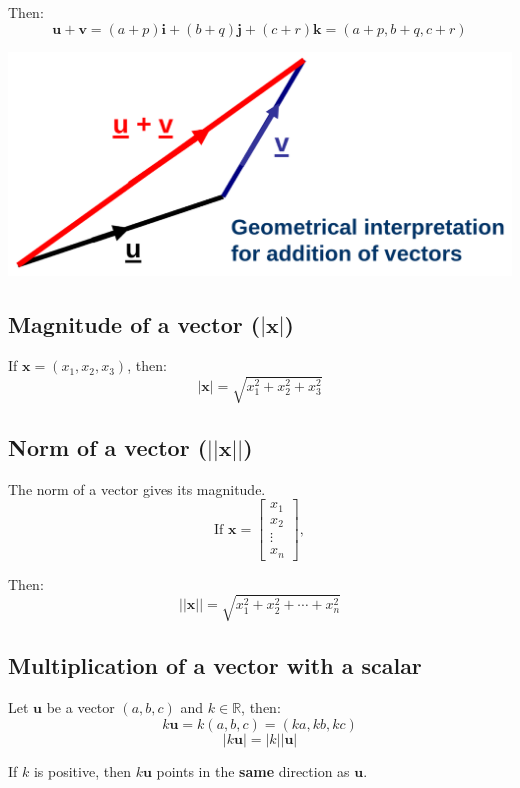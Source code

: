 \documentclass[11pt]{article}
\begin{document}
Then:
\[\boldsymbol{u} + \boldsymbol{v} = (a + p) \boldsymbol{i} + (b + q) \boldsymbol{j} + (c + r) \boldsymbol{k} = (a + p, b + q, c + r)\]

\begin{center}
\includegraphics[width=.9\linewidth]{./images/addition-of-vectors-geometrical-interpretation.png}
\end{center}
\subsection{Magnitude of a vector (\(| \boldsymbol{x} |\))}
\label{sec:org0436915}
If \(\boldsymbol{x} = (x_1, x_2, x_3)\), then:
\[| \boldsymbol{x} | = \sqrt{x_1^2 + x_2^2 + x_3^2}\]
\subsection{Norm of a vector (\(|| \boldsymbol{x} ||\))}
\label{sec:org50fc3e5}
The norm of a vector gives its magnitude.
\begin{displaymath}
\text{If } \boldsymbol{x} = \begin{bmatrix}
x_1 \\
x_2 \\
\vdots \\
x_n
\end{bmatrix},
\end{displaymath}

Then:
\[|| \boldsymbol{x} || = \sqrt{x_1^2 + x_2^2 + \cdots + x_n^2}\]
\subsection{Multiplication of a vector with a scalar}
\label{sec:orgd555a85}
Let \(\boldsymbol{u}\) be a vector \((a, b, c)\) and \(k \in \mathbb{R}\), then:
\[k \boldsymbol{u} = k (a, b, c) = (ka, kb, kc)\]
\[|k \boldsymbol{u}| = |k| |\boldsymbol{u}|\]

If \(k\) is positive, then \(k \boldsymbol{u}\) points in the \textbf{same} direction as \(\boldsymbol{u}\).
\end{document}
